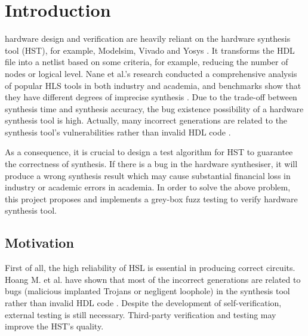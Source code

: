\chapter{Introduction}
\renewcommand{\baselinestretch}{\mystretch}
\label{chap:Intro}
 hardware design and verification are heavily reliant on the hardware synthesis tool (HST), for example, Modelsim, Vivado and Yosys \cite{hardsyntool}. It transforms the HDL file into a netlist based on some criteria, for example, reducing the number of nodes or logical level. Nane et al.'s research conducted a comprehensive analysis of popular HLS tools in both industry and academia, and benchmarks show that they have different degrees of imprecise synthesis \cite{toolsevaulation}. Due to the trade-off between synthesis time and synthesis accuracy, the bug existence possibility of a hardware synthesis tool is high. Actually, many incorrect generations are related to the synthesis tool's vulnerabilities rather than invalid HDL code \cite{torjans}. 

As a consequence, it is crucial to design a test algorithm for HST to guarantee the correctness of synthesis. If there is a bug in the hardware synthesiser, it will produce a wrong synthesis result which may cause substantial financial loss in industry or academic errors in academia. In order to solve the above problem, this project proposes and implements a grey-box fuzz testing to verify hardware synthesis tool.



\section{Motivation}
First of all, the high reliability of HSL is essential in producing correct circuits. Hoang M. et al. have shown that most of the incorrect generations are related to bugs (malicious implanted Trojans or negligent loophole) in the synthesis tool rather than invalid HDL code \cite{torjans}. Despite the development of self-verification, external testing is still necessary. Third-party verification and testing may improve the HST's quality.


